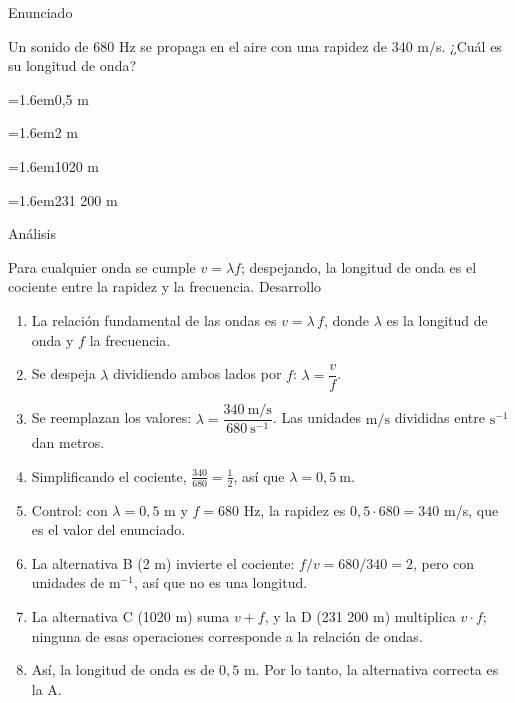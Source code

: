\documentclass[10pt,a4paper,twocolumn]{article}
\newcommand{\alternativa}[2]{\par\noindent\hangindent=1.6em\hangafter=1\makebox[1.6em][l]{\tecla{#1}}#2\par}
\newcommand{\clave}[1]{\par\smallskip{\sffamily\footnotesize\color{esmeralda} Clave \teclaok{#1}}\par}
\begin{document}
\begin{ejemplo}
{\sffamily\footnotesize\color{zinc500} Enunciado}\par
Un sonido de 680 Hz se propaga en el aire con una rapidez de 340 m/s. ¿Cuál es su longitud de onda?
\alternativa{A}{0,5 m}
\alternativa{B}{2 m}
\alternativa{C}{1020 m}
\alternativa{D}{231 200 m}
\clave{A}
{\sffamily\footnotesize\color{zinc500} Análisis}\par Para cualquier onda se cumple $v = \lambda f$; despejando, la longitud de onda es el cociente entre la rapidez y la frecuencia.
{\sffamily\footnotesize\color{zinc500} Desarrollo}
\begin{enumerate}
  \item La relación fundamental de las ondas es $v = \lambda\, f$, donde $\lambda$ es la longitud de onda y $f$ la frecuencia.
  \item Se despeja $\lambda$ dividiendo ambos lados por $f$: $\lambda = \dfrac{v}{f}$.
  \item Se reemplazan los valores: $\lambda = \dfrac{340\ \mathrm{m/s}}{680\ \mathrm{s^{-1}}}$. Las unidades $\mathrm{m/s}$ divididas entre $\mathrm{s^{-1}}$ dan metros.
  \item Simplificando el cociente, $\frac{340}{680} = \frac{1}{2}$, así que $\lambda = 0{,}5\ \mathrm{m}$.
  \item Control: con $\lambda = 0{,}5$ m y $f = 680$ Hz, la rapidez es $0{,}5 \cdot 680 = 340$ m/s, que es el valor del enunciado.
  \item La alternativa B (2 m) invierte el cociente: $f/v = 680/340 = 2$, pero con unidades de $\mathrm{m^{-1}}$, así que no es una longitud.
  \item La alternativa C (1020 m) suma $v + f$, y la D (231 200 m) multiplica $v \cdot f$; ninguna de esas operaciones corresponde a la relación de ondas.
  \item Así, la longitud de onda es de $0{,}5$ m. Por lo tanto, la alternativa correcta es la A.
\end{enumerate}
\end{ejemplo}
\end{document}
